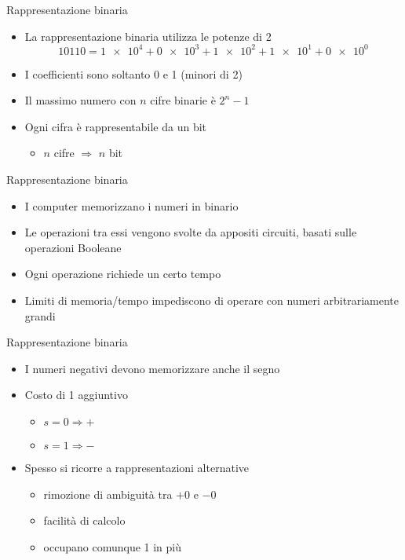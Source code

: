 \documentclass[xcolor=dvipsnames,handout]{beamer}
\begin{document}
\begin{frame}{Rappresentazione binaria}
  \vfill
  \begin{itemize}
    \item La rappresentazione \alert{binaria} utilizza le potenze di 2
    \[\num[group-digits = false]{10110} = \num[exponent-base = 2]{1e4} + \num[exponent-base = 2]{0e3}
    + \num[exponent-base = 2]{1e2} + \num[exponent-base = 2]{1e1} + \num[exponent-base = 2]{0e0}\]
    \item I coefficienti sono soltanto 0 e 1 (\alert{minori} di 2)
    \vfill
    \item Il massimo numero con \(n\) cifre binarie è \(2^n - 1\)
    \vfill
    \item Ogni cifra è rappresentabile da un \alert{bit}
    \begin{itemize}
      \item \(n\) cifre \(\Rightarrow\) \(n\) bit
    \end{itemize}
  \end{itemize}
  \vfill
\end{frame}

\begin{frame}{Rappresentazione binaria}
  \vfill
  \begin{itemize}
    \item I computer memorizzano i numeri in binario
    \vfill
    \item Le operazioni tra essi vengono svolte da appositi circuiti, basati
    sulle operazioni Booleane
    \vfill
    \item Ogni operazione richiede un certo tempo
    \vfill
    \item Limiti di memoria/tempo impediscono di operare con numeri arbitrariamente
    grandi
  \end{itemize}
  \vfill
\end{frame}

\begin{frame}{Rappresentazione binaria}
  \vfill
  \begin{itemize}
    \item I numeri negativi devono memorizzare anche il segno
    \vfill
    \item Costo di \SI{1}{\bit} aggiuntivo
    \begin{itemize}
      \item \(s = 0 \Rightarrow +\)
      \item \(s = 1 \Rightarrow -\)
    \end{itemize}
    \vfill
    \item Spesso si ricorre a rappresentazioni alternative
    \begin{itemize}
      \item rimozione di ambiguità tra \(+0\) e \(-0\)
      \item facilità di calcolo
      \item occupano comunque \SI{1}{\bit} in più
    \end{itemize}
  \end{itemize}
  \vfill
\end{frame}
\end{document}
